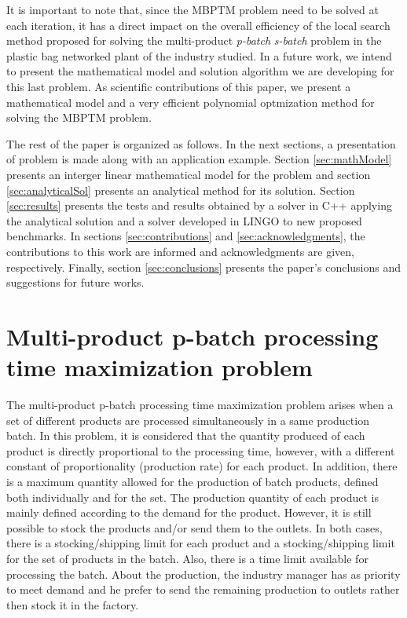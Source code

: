 \documentclass[authoryear,manuscript,12pt]{elsarticle}
\begin{document}
It is important to note that, since the MBPTM problem need to be solved at each iteration, it has a direct impact on the overall efficiency of the local search method proposed for solving the multi-product \emph{p-batch} \emph{s-batch} problem in the plastic bag networked plant of the industry studied. In a future work, we intend to present the mathematical model and solution algorithm we are developing for this last problem. As scientific contributions of this paper, we present a mathematical model and a very efficient polynomial optmization method for solving the MBPTM problem.

The rest of the paper is organized as follows. In the next sections, a presentation of problem is made along with an application example. Section \ref{sec:mathModel} presents an interger linear mathematical model for the problem and section \ref{sec:analyticalSol} presents an analytical method for its solution. Section \ref{sec:results} presents the tests and results obtained by a solver in C++ applying the analytical solution and a solver developed in LINGO to new proposed benchmarks. In sections \ref{sec:contributions} and \ref{sec:acknowledgments}, the contributions to this work are informed and acknowledgments are given, respectively. Finally, section \ref{sec:conclusions} presents the paper's conclusions and suggestions for future works.


\section{Multi-product p-batch processing time maximization problem}
\label{sec:MBPTMP}

The multi-product p-batch processing time maximization problem arises when a set of different products are processed simultaneously in a same production batch. In this problem, it is considered that the quantity produced of each product is directly proportional to the processing time, however, with a different constant of proportionality (production rate) for each product. In addition, there is a maximum quantity allowed for the production of batch products, defined both individually and for the set. The production quantity of each product is mainly defined according to the demand for the product. However, it is still possible to stock the products and/or send them to the outlets. In both cases, there is a stocking/shipping limit for each product and a stocking/shipping limit for the set of products in the batch. Also, there is a time limit available for processing the batch. About the production, the industry manager has as priority to meet demand and he prefer to send the remaining production to outlets rather then stock it in the factory. 
\end{document}
